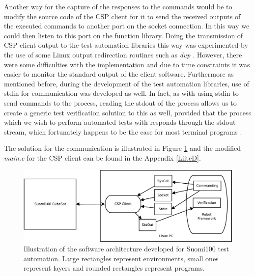 \documentclass[english,12pt,a4paper,pdftex,elec,utf8]{aaltothesis}
\begin{document}
Another way for the capture of the responses to the commands would be to modify the source code of the CSP client for it to send the received outputs of the executed commands to another port on the socket connection. In this way we could then listen to this port on the function library. Doing the transmission of CSP client output to the test automation libraries this way was experimented by the use of some Linux output redirection routines such as \textit{dup} \cite{linuxproginterface}. However, there were some difficulties with the implementation and due to time constraints it was easier to monitor the standard output of the client software. Furthermore as mentioned before, during the development of the test automation libraries, use of stdin for communication was developed as well. In fact, as with using stdin to send commands to the process, reading the stdout of the process allows us to create a generic test verification solution to this as well, provided that the process which we wish to perform automated tests with responds through the stdout stream, which fortunately happens to be the case for most terminal programs \cite{linuxproginterface}.
\par   
The solution for the communication is illustrated in Figure \ref{cspauto} and the modified \textit{main.c} for the CSP client can be found in the Appendix \ref{LiiteD}.
\begin{figure}[h!]
\centering
\includegraphics[scale=0.5]{cspautomation}
\caption{Illustration of the software architecture developed for Suomi100 test automation. Large rectangles represent environments, small ones represent layers and rounded rectangles represent programs.}
\label{cspauto}
\end{figure} 
\end{document}
